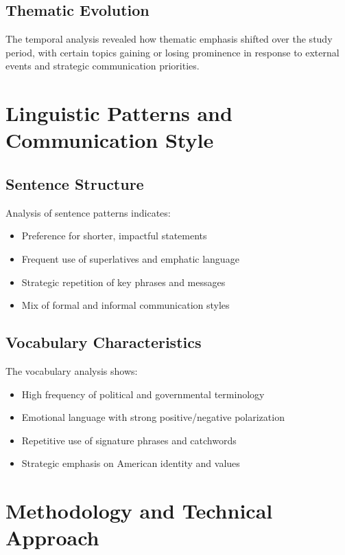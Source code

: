 \documentclass[12pt,a4paper]{article}
\begin{document}
\subsection{Thematic Evolution}

The temporal analysis revealed how thematic emphasis shifted over the study period, with certain topics gaining or losing prominence in response to external events and strategic communication priorities.

\section{Linguistic Patterns and Communication Style}

\subsection{Sentence Structure}

Analysis of sentence patterns indicates:
\begin{itemize}
    \item Preference for shorter, impactful statements
    \item Frequent use of superlatives and emphatic language
    \item Strategic repetition of key phrases and messages
    \item Mix of formal and informal communication styles
\end{itemize}

\subsection{Vocabulary Characteristics}

The vocabulary analysis shows:
\begin{itemize}
    \item High frequency of political and governmental terminology
    \item Emotional language with strong positive/negative polarization  
    \item Repetitive use of signature phrases and catchwords
    \item Strategic emphasis on American identity and values
\end{itemize}

\section{Methodology and Technical Approach}
\end{document}
